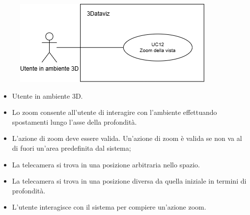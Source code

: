\begin{figure}[h!]\centering
    \includegraphics[scale=0.6]{template/images/UC12.png}
    \caption{}
\end{figure}
\UCdsc
{ %
    \begin{itemize}
        \item Utente in ambiente 3D.
    \end{itemize}
}
{ %
    \begin{itemize}
        \item Lo zoom consente all'utente di interagire con l'ambiente effettuando spostamenti lungo l'asse della profondità.
    \end{itemize}
}
{ %
    \begin{itemize}
        \item L'azione di zoom deve essere valida. Un'azione di zoom è valida se non va al di fuori un'area predefinita dal sistema;
        \item La telecamera si trova in una posizione arbitraria nello spazio.
    \end{itemize}
}
{ %
    \begin{itemize}
        \item La telecamera si trova in una posizione diversa da quella iniziale in termini di profondità.
    \end{itemize}
}
{ %
    \begin{itemize}
        \item L'utente interagisce con il sistema per compiere un'azione zoom.
    \end{itemize}
} 



